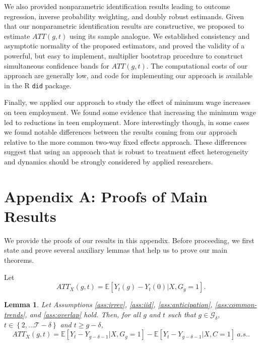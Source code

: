 \documentclass[11pt]{article}%
\theoremstyle{plain}
\newtheorem{lemma}{Lemma}
\numberwithin{sassumption}{section}
\numberwithin{equation}{section}
\begin{document}
We also provided nonparametric identification results leading to outcome regression, inverse probability weighting, and doubly robust estimands.  Given that our nonparametric identification results are constructive, we proposed to estimate $ATT(g,t)$ using its sample analogue. We established consistency and asymptotic normality of the proposed estimators, and proved the validity of a powerful, but easy to implement, multiplier bootstrap procedure to construct simultaneous confidence bands for $ATT(g,t)$.  The computational costs of our approach are generally low, and code for implementing our approach is available in the R \texttt{did} package.

Finally, we applied our approach to study the effect of minimum wage increases on teen employment. We found some evidence that increasing the minimum wage led to reductions in teen employment.  More interestingly though, in some cases we found notable differences between the results coming from our approach relative to the more common two-way fixed effects approach.  These differences suggest that using an approach that is robust to treatment effect heterogeneity and dynamics should be strongly considered by applied researchers.

\section*{Appendix A: Proofs of Main Results\label{App.A}}

\renewcommand{\thesection}{A}
\renewcommand{\theassumption}{A.\arabic{assumption}}
\renewcommand{\thelemma}{A.\arabic{lemma}} \setcounter{lemma}{0}
\setcounter{equation}{0} \setcounter{figure}{0} \setcounter{section}{0}
\setcounter{assumption}{0} {\small We provide the proofs of our results in
this appendix. Before proceeding, we first state and prove several auxiliary
lemmas that help us to prove our main theorems. }

{\small Let
\[
ATT_{X}(g,t)=\mathbb{E}[Y_{t}(g)-Y_{t}(0)|X,G_{g}=1].
\]
}

\begin{lemma}
{\small \label{lem:att1} Let Assumptions \ref{ass:irrev}, \ref{ass:iid},
\ref{ass:anticipation}, \ref{ass:common-trends}, and \ref{ass:overlap} hold.
Then, for all $g$ and $t$ such that $g\in\mathcal{G}_{\delta}$, $t\in\left\{
2,\dots\mathcal{T-\delta}\right\}  $ and $t\geq g-\delta$,
\[
ATT_{X}(g,t)=\mathbb{E}[Y_{t}-Y_{g-\delta-1}|X,G_{g}=1]-\mathbb{E}%
[Y_{t}-Y_{g-\delta-1}|X,C=1]\ a.s..
\]
}
\end{lemma}
\end{document}
